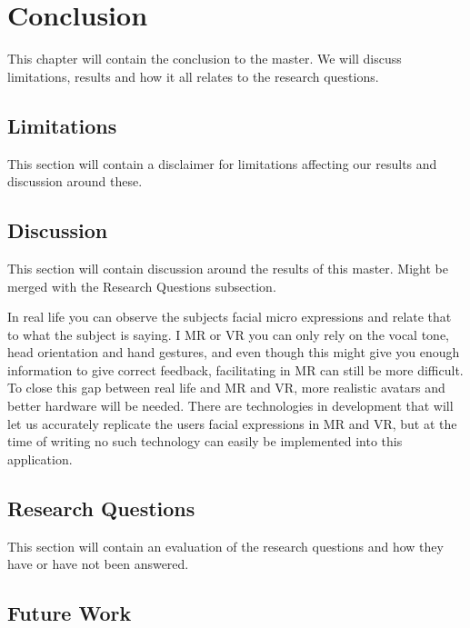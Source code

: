 \chapter{Conclusion}
    This chapter will contain the conclusion to the master. We will discuss limitations, results and how it all relates to the research questions.

    \section{Limitations}
    This section will contain a disclaimer for limitations affecting our results and discussion around these.
    
    \section{Discussion}
    This section will contain discussion around the results of this master. Might be merged with the Research Questions subsection.
    
    In real life you can observe the subjects facial micro expressions and relate that to what the subject is saying. I MR or VR you can only rely on the vocal tone, head orientation and hand gestures, and even though this might give you enough information to give correct feedback, facilitating in MR can still be more difficult. To close this gap between real life and MR and VR, more realistic avatars and better hardware will be needed. There are technologies in development that will let us accurately replicate the users facial expressions in MR and VR, but at the time of writing no such technology can easily be implemented into this application.
    
    \section{Research Questions}
    This section will contain an evaluation of the research questions and how they have or have not been answered.
    
    \section{Future Work}